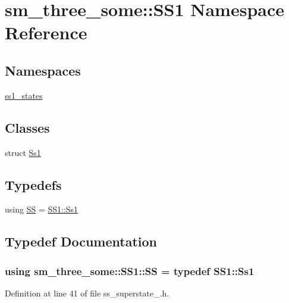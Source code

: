 \hypertarget{namespacesm__three__some_1_1SS1}{}\section{sm\+\_\+three\+\_\+some\+:\+:S\+S1 Namespace Reference}
\label{namespacesm__three__some_1_1SS1}
\subsection*{Namespaces}
\begin{DoxyCompactItemize}
\item 
 \hyperlink{namespacesm__three__some_1_1SS1_1_1ss1__states}{ss1\+\_\+states}
\end{DoxyCompactItemize}
\subsection*{Classes}
\begin{DoxyCompactItemize}
\item 
struct \hyperlink{structsm__three__some_1_1SS1_1_1Ss1}{Ss1}
\end{DoxyCompactItemize}
\subsection*{Typedefs}
\begin{DoxyCompactItemize}
\item 
using \hyperlink{namespacesm__three__some_1_1SS1_ac4d8073976f20771e5e3e2320b19014f}{SS} = \hyperlink{structsm__three__some_1_1SS1_1_1Ss1}{S\+S1\+::\+Ss1}
\end{DoxyCompactItemize}


\subsection{Typedef Documentation}
\subsubsection[{\texorpdfstring{SS}{SS}}]{\setlength{\rightskip}{0pt plus 5cm}using {\bf sm\+\_\+three\+\_\+some\+::\+S\+S1\+::\+SS} = typedef {\bf S\+S1\+::\+Ss1}}\hypertarget{namespacesm__three__some_1_1SS1_ac4d8073976f20771e5e3e2320b19014f}{}\label{namespacesm__three__some_1_1SS1_ac4d8073976f20771e5e3e2320b19014f}


Definition at line 41 of file ss\+\_\+superstate\+\_.\+h.

